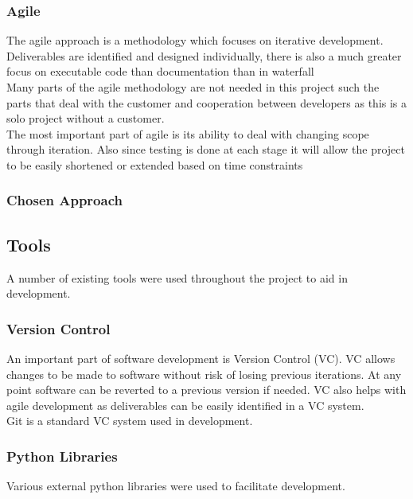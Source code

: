 \documentclass{article}
\begin{document}
\subsubsection{Agile}
The agile approach is a methodology which focuses on iterative development. Deliverables are identified and designed individually, there is also a much greater focus on executable code than documentation than in waterfall\\

Many parts of the agile methodology are not needed in this project such the parts that deal with the customer and cooperation between developers as this is a solo project without a customer.\\

The most important part of agile is its ability to deal with changing scope through iteration. Also since testing is done at each stage it will allow the project to be easily shortened or extended based on time constraints\\

\subsubsection{Chosen Approach}

\subsection{Tools}
A number of existing tools were used throughout the project to aid in development. 

\subsubsection{Version Control}
An important part of software development is Version Control (VC). VC allows changes to be made to software without risk of losing previous iterations. At any point software can be reverted to a previous version if needed. VC also helps with agile development as deliverables can be easily identified in a VC system.\\

Git is a standard VC system used in development.\\

\subsubsection{Python Libraries}
Various external python libraries were used to facilitate development.\\
\end{document}
